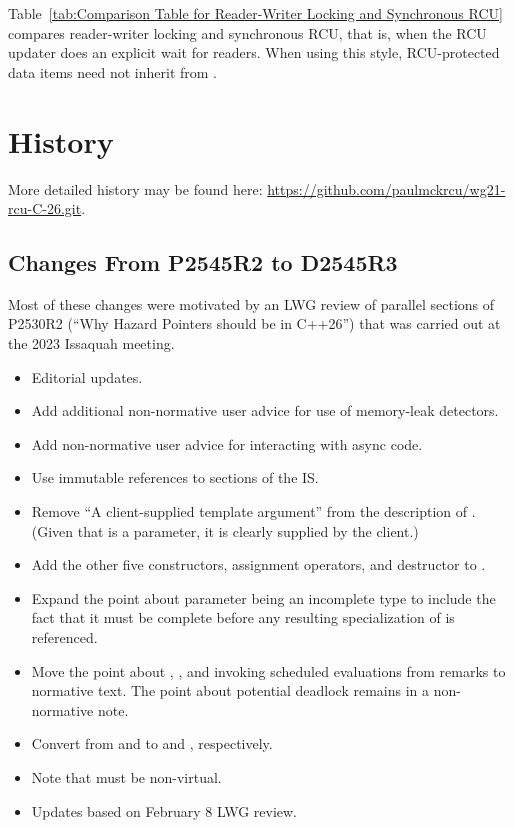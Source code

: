 Table~\ref{tab:Comparison Table for Reader-Writer Locking and Synchronous RCU}
compares reader-writer locking and synchronous RCU, that is, when the
RCU updater does an explicit wait for readers.
When using this style, RCU-protected data items need not inherit from
.

\section{History}
\label{sec:History}

More detailed history may be found here:
\url{https://github.com/paulmckrcu/wg21-rcu-C-26.git}.

\subsection{Changes From P2545R2 to D2545R3}
\label{sec:Changes From P2545R2 to D2545R3}

Most of these changes were motivated by an LWG review of parallel sections
of P2530R2 (``Why Hazard Pointers should be in C++26'') that was carried
out at the 2023 Issaquah meeting.

\begin{itemize}
\item	Editorial updates.
\item	Add additional non-normative user advice for use of memory-leak
	detectors.
\item	Add non-normative user advice for interacting with async code.
\item	Use immutable references to sections of the IS.
\item	Remove ``A client-supplied template argument'' from the description
	of .
	(Given that  is a parameter, it is clearly supplied by
	the client.)
\item	Add the other five constructors, assignment operators, and
	destructor to .
\item	Expand the point about parameter  being an incomplete
	type to include the fact that it must be complete before any
	resulting specialization of  is referenced.
\item	Move the point about , , and
	 invoking scheduled evaluations
	from remarks to normative text.
	The point about potential deadlock remains in a non-normative note.
\item	Convert from  and  to  and
	, respectively.
\item	Note that  must be non-virtual.
\item	Updates based on February 8 LWG review.
\end{itemize}

